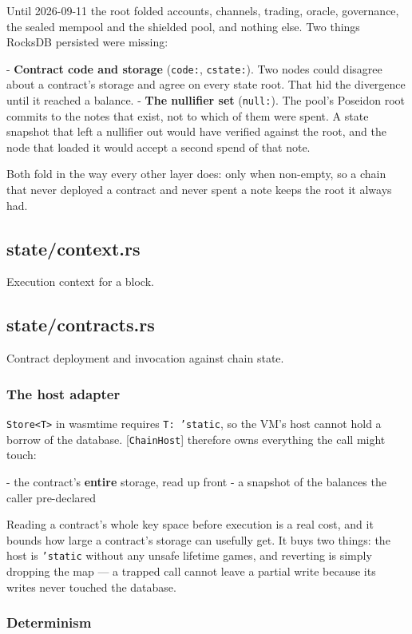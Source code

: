 \documentclass[11pt,a4paper]{article}
\begin{document}
Until 2026-09-11 the root folded accounts, channels, trading, oracle,
governance, the sealed mempool and the shielded pool, and nothing else. Two
things RocksDB persisted were missing:

- \textbf{Contract code and storage} (\texttt{code:}, \texttt{cstate:}). Two nodes could
  disagree about a contract's storage and agree on every state root. That
  hid the divergence until it reached a balance.
- \textbf{The nullifier set} (\texttt{null:}). The pool's Poseidon root commits to the
  notes that exist, not to which of them were spent. A state snapshot that
  left a nullifier out would have verified against the root, and the node
  that loaded it would accept a second spend of that note.

Both fold in the way every other layer does: only when non-empty, so a chain
that never deployed a contract and never spent a note keeps the root it
always had.

\subsection{state/context.rs}
Execution context for a block.

\subsection{state/contracts.rs}
Contract deployment and invocation against chain state.

\subsubsection{The host adapter}

\texttt{Store<T>} in wasmtime requires \texttt{T: 'static}, so the VM's host cannot hold a
borrow of the database. [\texttt{ChainHost}] therefore owns everything the call
might touch:

- the contract's \textbf{entire} storage, read up front
- a snapshot of the balances the caller pre-declared

Reading a contract's whole key space before execution is a real cost, and it
bounds how large a contract's storage can usefully get. It buys two things:
the host is \texttt{'static} without any unsafe lifetime games, and reverting is
simply dropping the map — a trapped call cannot leave a partial write
because its writes never touched the database.

\subsubsection{Determinism}
\end{document}
